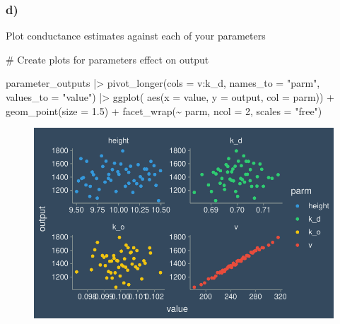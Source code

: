 \documentclass[
  letterpaper,
  DIV=11,
  numbers=noendperiod]{scrartcl}
\newenvironment{Shaded}{\begin{snugshade}}{\end{snugshade}}
\newcommand{\AttributeTok}[1]{\textcolor[rgb]{0.40,0.45,0.13}{#1}}
\newcommand{\CommentTok}[1]{\textcolor[rgb]{0.37,0.37,0.37}{#1}}
\newcommand{\DecValTok}[1]{\textcolor[rgb]{0.68,0.00,0.00}{#1}}
\newcommand{\FloatTok}[1]{\textcolor[rgb]{0.68,0.00,0.00}{#1}}
\newcommand{\FunctionTok}[1]{\textcolor[rgb]{0.28,0.35,0.67}{#1}}
\newcommand{\NormalTok}[1]{\textcolor[rgb]{0.00,0.23,0.31}{#1}}
\newcommand{\SpecialCharTok}[1]{\textcolor[rgb]{0.37,0.37,0.37}{#1}}
\newcommand{\StringTok}[1]{\textcolor[rgb]{0.13,0.47,0.30}{#1}}
\begin{document}
\hypertarget{d}{%
\subsubsection{d)}\label{d}}

Plot conductance estimates against each of your parameters

\begin{Shaded}
\begin{Highlighting}[]
\CommentTok{\# Create plots for parameters effect on output}

\NormalTok{parameter\_outputs }\SpecialCharTok{|\textgreater{}} 
  \FunctionTok{pivot\_longer}\NormalTok{(}\AttributeTok{cols =}\NormalTok{ v}\SpecialCharTok{:}\NormalTok{k\_d, }\AttributeTok{names\_to =} \StringTok{"parm"}\NormalTok{, }\AttributeTok{values\_to =} \StringTok{"value"}\NormalTok{) }\SpecialCharTok{|\textgreater{}} 
  \FunctionTok{ggplot}\NormalTok{( }\FunctionTok{aes}\NormalTok{(}\AttributeTok{x =}\NormalTok{ value, }\AttributeTok{y =}\NormalTok{ output, }\AttributeTok{col =}\NormalTok{ parm)) }\SpecialCharTok{+}
  \FunctionTok{geom\_point}\NormalTok{(}\AttributeTok{size =} \FloatTok{1.5}\NormalTok{) }\SpecialCharTok{+}
  \FunctionTok{facet\_wrap}\NormalTok{(}\SpecialCharTok{\textasciitilde{}}\NormalTok{ parm, }\AttributeTok{ncol =} \DecValTok{2}\NormalTok{, }\AttributeTok{scales =} \StringTok{"free"}\NormalTok{) }
\end{Highlighting}
\end{Shaded}

\begin{figure}[H]

{\centering \includegraphics{sensitivity-analysis_files/figure-pdf/unnamed-chunk-7-1.pdf}

}

\end{figure}
\end{document}
